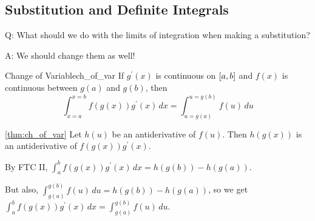 \subsection*{Substitution and Definite Integrals}
Q\@: What should we do with the limits of integration when making a substitution?

A\@: We should change them as well!

\begin{Theorem}{Change of Variable}{ch_of_var}
    If $ g^\prime(x) $ is continuous on $ \interval{a}{b} $ and $ f(x) $
    is continuous between $ g(a) $ and $ g(b) $, then
    \[ \int_{x=a}^{x=b} f(g(x))g^\prime(x)\, d{x} =
        \int_{u=g(a)}^{u=g(b)} f(u)\, d{u}  \]
\end{Theorem}

\begin{Proof}{\ref{thm:ch_of_var}}{}
    Let $ h(u) $ be an antiderivative of $ f(u) $. Then $ h(g(x)) $
    is an antiderivative of $ f(g(x))g^\prime(x) $.

    By FTC II,
    $ \displaystyle\int_{a}^{b} f(g(x))g^\prime(x)\, d{x} =h(g(b))-h(g(a)) $.

    But also,
    $ \displaystyle\int_{g(a)}^{g(b)} f(u)\, d{u} =h(g(b))-h(g(a)) $,
    so we get
    $ \displaystyle\int_{a}^{b} f(g(x))g^\prime(x)\, d{x} =\int_{g(a)}^{g(b)} f(u)\, d{u} $.
\end{Proof}

